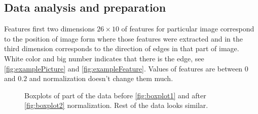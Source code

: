 \documentclass[]{article}
\begin{document}
\subsection{Data analysis and preparation}
  Features first two dimensions $26\times10$ of features for particular image correspond to the position of image form where those features were extracted and in the third dimension corresponds to the direction of edges in that part of image. White color and big number indicates that there is the edge, see \ref{fig:examplePicture} and \ref{fig:exampleFeature}. Values of features are between $0$ and $0.2$ and normalization doesn't change them much. 
  \begin{figure}[!h]
  \center
  \;
  \caption{Boxplots of part of the data before \ref{fig:boxplot1} and after \ref{fig:boxplot2} normalization. Rest of the data looks similar.}
\end{figure}
  
\end{document}
